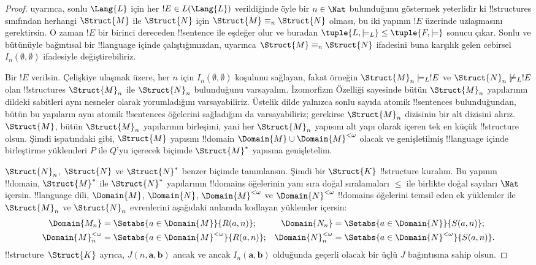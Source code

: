 \documentclass[../../../include/open-logic-section]{subfiles}
\begin{document}
\begin{proof}
 uyarınca, sonlu $\Lang{L}$ için her
$!E\in L(\Lang{L})$ verildiğinde öyle bir $n\in\Nat$ bulunduğunu göstermek
yeterlidir ki !!{structure}s sınıfından herhangi $\Struct{M}$ ile
$\Struct{N}$ için
$\Struct{M}\equiv_n\Struct{N}$ olması, bu iki yapının $!E$ üzerinde
uzlaşmasını gerektirsin. O zaman $!E$ bir birinci dereceden !!{sentence}
ile eşdeğer olur ve buradan
$\tuple{L,\models_L}\leq\tuple{F,\models}$ sonucu çıkar. Sonlu ve bütünüyle
bağıntısal bir !!{language} içinde çalıştığımızdan,
 uyarınca
$\Struct{M}\equiv_n\Struct{N}$ ifadesini buna karşılık gelen cebirsel
$I_n(\emptyset,\emptyset)$ ifadesiyle değiştirebiliriz.

Bir $!E$ verilsin. Çelişkiye ulaşmak üzere, her $n$ için
$I_n(\emptyset,\emptyset)$ koşulunu sağlayan, fakat örneğin
$\Struct{M}_n\models_L !E$ ve $\Struct{N}_n\not\models_L !E$ olan
!!{structure}s $\Struct{M}_n$ ile $\Struct{N}_n$ bulunduğunu varsayalım.
İzomorfizm Özelliği sayesinde bütün $\Struct{M}_n$ yapılarının dildeki
sabitleri aynı nesneler olarak yorumladığını varsayabiliriz. Üstelik dilde
yalnızca sonlu sayıda atomik !!{sentence}s bulunduğundan, bütün bu yapıların
aynı atomik !!{sentence}s öğelerini sağladığını da varsayabiliriz; gerekirse
$\Struct{M}_n$ dizisinin bir alt dizisini alırız. $\Struct{M}$, bütün
$\Struct{M}_n$ yapılarının birleşimi, yani her $\Struct{M}_n$ yapısını alt
yapı olarak içeren tek en küçük !!{structure} olsun. Şimdi
 ispatındaki gibi, $\Struct{M}$ yapısını
!!{domain} $\Domain{M}\cup\Domain{M}^{<\omega}$ olacak ve genişletilmiş
!!{language} içinde birleştirme yüklemleri $P$ ile $Q$'yu içerecek biçimde
$\Struct{M}^*$ yapısına genişletelim.

$\Struct{N}_n$, $\Struct{N}$ ve $\Struct{N}^*$ benzer biçimde tanımlansın.
Şimdi bir $\Struct{K}$ !!{structure} kuralım. Bu yapının !!{domain},
$\Struct{M}^*$ ile $\Struct{N}^*$ yapılarının !!{domain}s öğelerinin yanı
sıra doğal sıralamaları $\leq$ ile birlikte doğal sayıları $\Nat$ içersin.
!!{language} dili, $\Domain{M}$, $\Domain{N}$,
$\Domain{M}^{<\omega}$ ve $\Domain{N}^{<\omega}$ !!{domain}s öğelerini
temsil eden ek yüklemler ile $\Struct{M}_n$ ve $\Struct{N}_n$ evrenlerini
aşağıdaki anlamda kodlayan yüklemler içersin:
\begin{align*}
  \Domain{M_n} & = \Setabs{a\in\Domain{M}}{R(a,n)}; &
  \Domain{N_n} & = \Setabs{a\in\Domain{N}}{S(a,n)}; \\
  \Domain{M}^{<\omega}_n & =
    \Setabs{a\in\Domain{M}^{<\omega}}{R(a,n)}; &
  \Domain{N}^{<\omega}_n & =
    \Setabs{a\in\Domain{N}^{<\omega}}{S(a,n)}.
\end{align*}
!!{structure}~$\Struct{K}$ ayrıca, $J(n,\mathbf a,\mathbf b)$ ancak ve
ancak $I_n(\mathbf a,\mathbf b)$ olduğunda geçerli olacak bir üçlü $J$
bağıntısına sahip olsun.


\end{proof}
\end{document}
